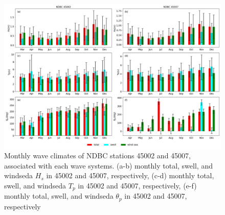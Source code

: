 \begin{figure}[htbp]
  \centering
  \includegraphics[width=1\textwidth]{chapter4/resources/ndbc_month.png}
  \caption{Monthly wave climates of NDBC stations 45002 and 45007, associated
  with each wave systems. (a-b) monthly total, swell, and windseda $H_s$ in 45002
  and 45007, respectively, (c-d) monthly total, swell, and windseda $T_p$ in
  45002 and 45007, respectively, (e-f) monthly total, swell, and windseda
  $\theta_p$ in 45002 and 45007, respectively }
  \label{fig:ndbc_month}
\end{figure}

